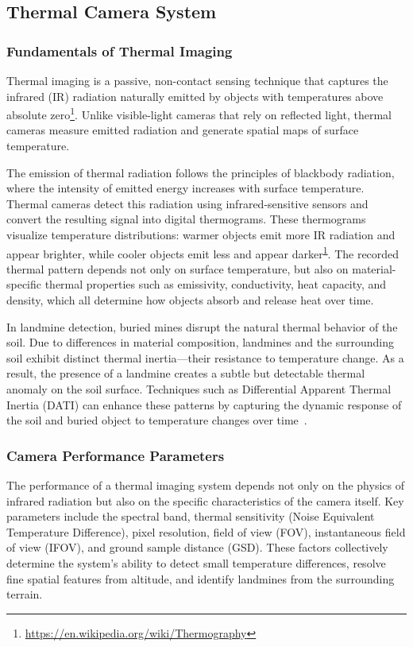 \subsection{Thermal Camera System}

\subsubsection{Fundamentals of Thermal Imaging}

Thermal imaging is a passive, non-contact sensing technique that captures the infrared (IR) radiation naturally emitted by objects with temperatures above absolute zero\footnote{\label{thermography}\url{https://en.wikipedia.org/wiki/Thermography}}. Unlike visible-light cameras that rely on reflected light, thermal cameras measure emitted radiation and generate spatial maps of surface temperature.

The emission of thermal radiation follows the principles of blackbody radiation, where the intensity of emitted energy increases with surface temperature. Thermal cameras detect this radiation using infrared-sensitive sensors and convert the resulting signal into digital thermograms. These thermograms visualize temperature distributions: warmer objects emit more IR radiation and appear brighter, while cooler objects emit less and appear darker\textsuperscript{\ref{thermography}}. The recorded thermal pattern depends not only on surface temperature, but also on material-specific thermal properties such as emissivity, conductivity, heat capacity, and density, which all determine how objects absorb and release heat over time.

In landmine detection, buried mines disrupt the natural thermal behavior of the soil. Due to differences in material composition, landmines and the surrounding soil exhibit distinct thermal inertia—their resistance to temperature change. As a result, the presence of a landmine creates a subtle but detectable thermal anomaly on the soil surface. Techniques such as Differential Apparent Thermal Inertia (DATI) can enhance these patterns by capturing the dynamic response of the soil and buried object to temperature changes over time~\cite{nikulin2018detection}.



\subsubsection{Camera Performance Parameters}

The performance of a thermal imaging system depends not only on the physics of infrared radiation but also on the specific characteristics of the camera itself. Key parameters include the spectral band, thermal sensitivity (Noise Equivalent Temperature Difference), pixel resolution, field of view (FOV), instantaneous field of view (IFOV), and ground sample distance (GSD). These factors collectively determine the system’s ability to detect small temperature differences, resolve fine spatial features from altitude, and identify landmines from the surrounding terrain.



